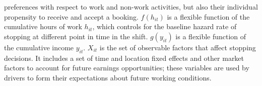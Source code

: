 \documentclass[reviewmode,AEJ]{AEA}
\begin{document}
preferences with respect to work and non-work activities, but also their individual propensity to receive 
and accept a booking. %
$f(h_{it})$ is a flexible function of the cumulative hours of work $h_{it}$, which controls for the baseline 
hazard rate of stopping at different point in time in the shift. $g(y_{it})$ is a flexible function 
of the cumulative income $y_{it}$. %
$X_{it}$ is the set of observable factors that affect stopping decisions.  
It includes a set of time and location fixed effects and other market factors to account for 
future earnings opportunities; these variables are used by drivers to form their expectations 
about future working conditions.


\end{document}
